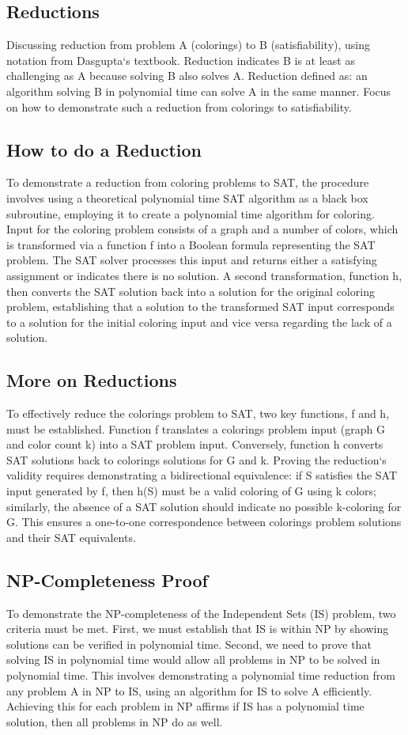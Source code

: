 \subsection*{Reductions}
Discussing reduction from problem A (colorings) to B (satisfiability), using notation from Dasgupta`s textbook.
Reduction indicates B is at least as challenging as A because solving B also solves A\@.
Reduction defined as: an algorithm solving B in polynomial time can solve A in the same manner.
Focus on how to demonstrate such a reduction from colorings to satisfiability.

\subsection*{How to do a Reduction}
To demonstrate a reduction from coloring problems to SAT, the procedure involves using a theoretical polynomial time SAT algorithm as a black box subroutine, employing it to create a polynomial time algorithm for coloring.
Input for the coloring problem consists of a graph and a number of colors, which is transformed via a function f into a Boolean formula representing the SAT problem.
The SAT solver processes this input and returns either a satisfying assignment or indicates there is no solution.
A second transformation, function h, then converts the SAT solution back into a solution for the original coloring problem, establishing that a solution to the transformed SAT input corresponds to a solution for the initial coloring input and vice versa regarding the lack of a solution.

\subsection*{More on Reductions}
To effectively reduce the colorings problem to SAT, two key functions, f and h, must be established.
Function f translates a colorings problem input (graph G and color count k) into a SAT problem input.
Conversely, function h converts SAT solutions back to colorings solutions for G and k.
Proving the reduction`s validity requires demonstrating a bidirectional equivalence: if S satisfies the SAT input generated by f, then h(S) must be a valid coloring of G using k colors; similarly, the absence of a SAT solution should indicate no possible k-coloring for G\@.
This ensures a one-to-one correspondence between colorings problem solutions and their SAT equivalents.

\subsection*{NP-Completeness Proof}
To demonstrate the NP-completeness of the Independent Sets (IS) problem, two criteria must be met.
First, we must establish that IS is within NP by showing solutions can be verified in polynomial time.
Second, we need to prove that solving IS in polynomial time would allow all problems in NP to be solved in polynomial time.
This involves demonstrating a polynomial time reduction from any problem A in NP to IS, using an algorithm for IS to solve A efficiently.
Achieving this for each problem in NP affirms if IS has a polynomial time solution, then all problems in NP do as well.


